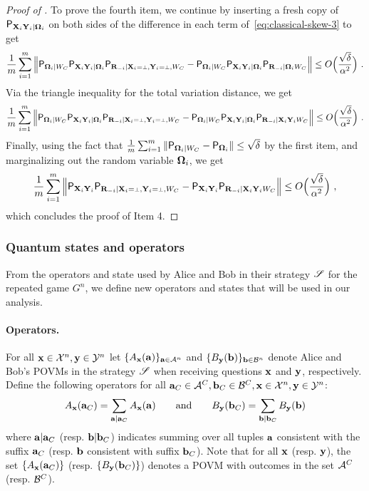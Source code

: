\begin{proof}[Proof of ]
To prove the fourth item, we continue by inserting a fresh copy of $\mathsf{P}_{\mathbf{X}_i \mathbf{Y}_i | {\boldsymbol{\Omega}}_i}$ on both sides of the difference in each term of~\eqref{eq:classical-skew-3} to get
\[
\frac{1}{m} \sum_{i=1}^m \Big \| \P_{\bOmega_i |W_C}\P_{\bX_i \bY_i | \bOmega_i}  \P_{\bR_\mi | \bX_i = \dummy, \bY_i = \dummy, W_C} - \P_{\bOmega_i | W_C} \P_{\bX_i \bY_i | \bOmega_i} \P_{\bR_\mi |\bOmega_i  W_C}  \Big \| \leq O \Big( \frac{\sqrt{\delta}}{\alpha^2} \Big)~.
\]
Via the triangle inequality for the total variation distance, we get
\[
\frac{1}{m} \sum_{i=1}^m \Big \| \P_{\bOmega_i |W_C}\P_{\bX_i \bY_i | \bOmega_i}  \P_{\bR_\mi | \bX_i = \dummy, \bY_i = \dummy, W_C} - \P_{\bOmega_i | W_C} \P_{\bX_i \bY_i | \bOmega_i} \P_{\bR_\mi | \bX_i \bY_i  W_C}  \Big \| \leq O \Big( \frac{\sqrt{\delta}}{\alpha^2} \Big)~.
\]
Finally, using the fact that $\frac{1}{m} \sum_{i=1}^m \| \mathsf{P}_{{\boldsymbol{\Omega}}_i | W_C} - \mathsf{P}_{{\boldsymbol{\Omega}}_i} \| \leq \sqrt{\delta}$ by the first item, and marginalizing out the random variable ${\boldsymbol{\Omega}}_i$, we get
\[
\frac{1}{m} \sum_{i=1}^m \Big \| \P_{\bX_i \bY_i}  \P_{\bR_\mi | \bX_i = \dummy, \bY_i = \dummy, W_C} - \P_{\bX_i \bY_i} \P_{\bR_\mi | \bX_i \bY_i  W_C}  \Big \| \leq O \Big( \frac{\sqrt{\delta}}{\alpha^2} \Big)~,
\]
which concludes the proof of Item 4.
\end{proof}

\subsubsection{Quantum states and operators}
\label{sec:states-operators} 
From the operators and state used by Alice and Bob in their strategy $\mathscr{S}$ for the repeated game $G^n$, we define new operators and states that will be used in our analysis.

\paragraph{Operators.} For all $\mathbf{x} \in \mathcal{X}^n, \mathbf{y} \in \mathcal{Y}^n$ let $\{A_{\mathbf{x}}(\mathbf{a})\}_{\mathbf{a} \in \mathcal{A}^n}$ and $\{B_{\mathbf{y}}(\mathbf{b})\}_{\mathbf{b} \in \mathcal{B}^n}$ denote Alice and Bob's POVMs in the strategy $\mathscr{S}$ when receiving questions $\mathbf{x}$ and $\mathbf{y}$, respectively. Define the following operators for all $\mathbf{a}_C \in \mathcal{A}^C, \mathbf{b}_C \in \mathcal{B}^C, \mathbf{x} \in \mathcal{X}^n, \mathbf{y} \in \mathcal{Y}^n$:
\begin{equation}
\label{eq:states-operators-1}
	A_{\mathbf{x}}(\mathbf{a}_C) = \sum_{\mathbf{a} | \mathbf{a}_C} A_{\mathbf{x}}(\mathbf{a}) \qquad\text{and} \qquad B_{\mathbf{y}}(\mathbf{b}_C) = \sum_{\mathbf{b} | \mathbf{b}_C} B_{\mathbf{y}}(\mathbf{b})
\end{equation}
where $\mathbf{a} | \mathbf{a}_C$ (resp. $\mathbf{b} | \mathbf{b}_C$) indicates summing over all tuples $\mathbf{a}$ consistent with the suffix $\mathbf{a}_C$ (resp. $\mathbf{b}$ consistent with suffix $\mathbf{b}_C$). Note that for all $\mathbf{x}$ (resp. $\mathbf{y}$), the set $\{ A_{\mathbf{x}}(\mathbf{a}_C) \}$ (resp. $\{ B_{\mathbf{y}}(\mathbf{b}_C) \}$) denotes a POVM with outcomes in the set $\mathcal{A}^C$ (resp. $\mathcal{B}^C$).

